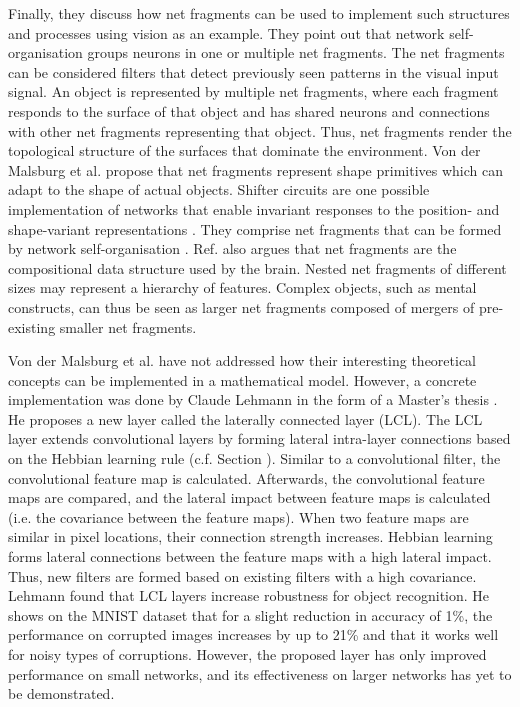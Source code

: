 Finally, they discuss how net fragments can be used to implement such structures and processes using vision as an example.
They point out that network self-organisation groups neurons in one or multiple net fragments.
The net fragments can be considered filters that detect previously seen patterns in the visual input signal.
An object is represented by multiple net fragments, where each fragment responds to the surface of that object and has shared neurons and connections with other net fragments representing that object.
Thus, net fragments render the topological structure of the surfaces that dominate the environment.
Von der Malsburg et al. \cite{von_der_Malsburg_Stadelmann_Grewe_2022} propose that net fragments represent shape primitives which can adapt to the shape of actual objects.
Shifter circuits are one possible implementation of networks that enable invariant responses to the position- and shape-variant representations .
They comprise net fragments that can be formed by network self-organisation .
Ref. \cite{von_der_Malsburg_Stadelmann_Grewe_2022} also argues that net fragments are the compositional data structure used by the brain.
Nested net fragments of different sizes may represent a hierarchy of features.
Complex objects, such as mental constructs, can thus be seen as larger net fragments composed of mergers of pre-existing smaller net fragments.

Von der Malsburg et al. \cite{von_der_Malsburg_Stadelmann_Grewe_2022} have not addressed how their interesting theoretical concepts can be implemented in a mathematical model.
However, a concrete implementation was done by Claude Lehmann in the form of a Master's thesis .
He proposes a new layer called the laterally connected layer (LCL).
The LCL layer extends convolutional layers by forming lateral intra-layer connections based on the Hebbian learning rule (c.f. Section ).
Similar to a convolutional filter, the convolutional feature map is calculated.
Afterwards, the convolutional feature maps are compared, and the lateral impact between feature maps is calculated (i.e. the covariance between the feature maps).
When two feature maps are similar in pixel locations, their connection strength increases.
Hebbian learning forms lateral connections between the feature maps with a high lateral impact.
Thus, new filters are formed based on existing filters with a high covariance.
Lehmann found that LCL layers increase robustness for object recognition.
He shows on the MNIST dataset \cite{Lecun_Bottou_Bengio_Haffner_1998} that for a slight reduction in accuracy of 1\%, the performance on corrupted images increases by up to 21\% and that it works well for noisy types of corruptions.
However, the proposed layer has only improved performance on small networks, and its effectiveness on larger networks has yet to be demonstrated.

